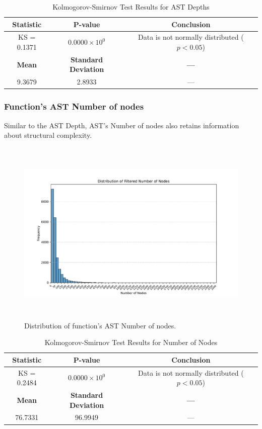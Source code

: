 \documentclass[10pt,english,a4paper]{report}
\begin{document}
\begin{table}[h!]
    \centering
    \caption{Kolmogorov-Smirnov Test Results for AST Depths}
    \label{tab:kolmogorov_smirnov_depths}
    \begin{tabular}{|c|c|c|}
        \hline
        \textbf{Statistic} & \textbf{P-value} & \textbf{Conclusion} \\
        \hline
        KS = 0.1371 & $0.0000 \times 10^{0}$ & Data is not normally distributed ($p < 0.05$) \\
        \hline
        \textbf{Mean} & \textbf{Standard Deviation} & \textbf{---} \\
        \hline
        9.3679 & 2.8933 & --- \\
        \hline
    \end{tabular}
\end{table}

\subsubsection{Function's AST Number of nodes}

Similar to the AST Depth, AST's Number of nodes also retains information
about structural complexity.

\begin{figure}[H]
    \centering
    \includegraphics[width=16cm, height=9cm]{figures/num_nodes_merged.pdf} 
    \caption{Distribution of function's AST Number of nodes.}
    \label{fig:func_lengths_distr_merged}
\end{figure}

\begin{table}[h!]
    \centering
    \caption{Kolmogorov-Smirnov Test Results for Number of Nodes}
    \label{tab:kolmogorov_smirnov_nodes}
    \begin{tabular}{|c|c|c|}
        \hline
        \textbf{Statistic} & \textbf{P-value} & \textbf{Conclusion} \\
        \hline
        KS = 0.2484 & $0.0000 \times 10^{0}$ & Data is not normally distributed ($p < 0.05$) \\
        \hline
        \textbf{Mean} & \textbf{Standard Deviation} & \textbf{---} \\
        \hline
        76.7331 & 96.9949 & --- \\
        \hline
    \end{tabular}
\end{table}
\end{document}
